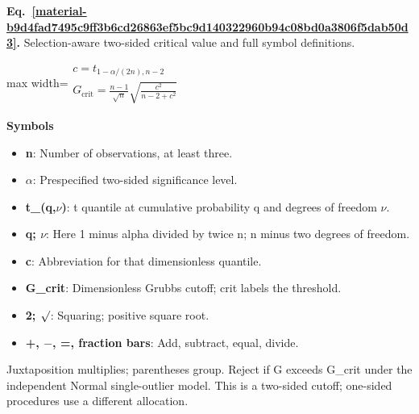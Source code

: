 \documentclass[11pt,a4paper]{article}
\begin{document}
\par\medskip
\noindent\begin{minipage}{\linewidth}
\label{material-b9d4fad7495c9ff3b6cd26863ef5bc9d140322960b94c08bd0a3806f5dab50d3}
\noindent\textbf{Eq.~\ref*{material-b9d4fad7495c9ff3b6cd26863ef5bc9d140322960b94c08bd0a3806f5dab50d3}.} Selection-aware two-sided critical value and full symbol definitions.\par\nopagebreak
\begin{center}\begin{adjustbox}{max width=\linewidth}$\displaystyle \begin{gathered}c=t_{1-\alpha/(2n),n-2}\\G_{\mathrm{crit}}=\frac{n-1}{\sqrt n}\sqrt{\frac{c^2}{n-2+c^2}}\end{gathered}$\end{adjustbox}\end{center}

\par\noindent\textbf{Symbols}

\begin{itemize}\setlength{\itemsep}{1pt}\setlength{\parsep}{0pt}
\item \textbf{n}: Number of observations, at least three.
\item \textbf{\ensuremath{\alpha}}: Prespecified two-sided significance level.
\item \textbf{t\_(q,\ensuremath{\nu})}: t quantile at cumulative probability q and degrees of freedom \ensuremath{\nu}.
\item \textbf{q; \ensuremath{\nu}}: Here 1 minus alpha divided by twice n; n minus two degrees of freedom.
\item \textbf{c}: Abbreviation for that dimensionless quantile.
\item \textbf{G\_crit}: Dimensionless Grubbs cutoff; crit labels the threshold.
\item \textbf{2; \ensuremath{\sqrt{\vphantom{x}}}}: Squaring; positive square root.
\item \textbf{+, \ensuremath{-}, =, fraction bars}: Add, subtract, equal, divide.
\end{itemize}

Juxtaposition multiplies; parentheses group. Reject if G exceeds G\_crit under the independent Normal single-outlier model. This is a two-sided cutoff; one-sided procedures use a different allocation.

\end{minipage}\par
\medskip
\end{document}
